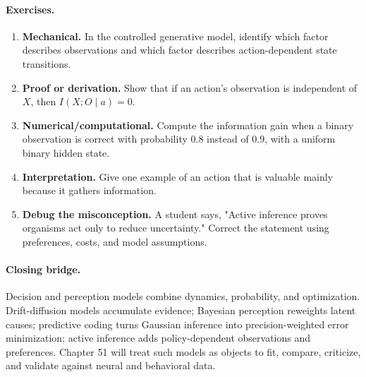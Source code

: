 \paragraph{Exercises.}
\begin{enumerate}[label=\textbf{50.4.\arabic*.}, leftmargin=*]
\item \textbf{Mechanical.} In the controlled generative model, identify which factor describes observations and which factor describes action-dependent state transitions.
\item \textbf{Proof or derivation.} Show that if an action's observation is independent of \(X\), then \(I(X;O\mid a)=0\).
\item \textbf{Numerical/computational.} Compute the information gain when a binary observation is correct with probability \(0.8\) instead of \(0.9\), with a uniform binary hidden state.
\item \textbf{Interpretation.} Give one example of an action that is valuable mainly because it gathers information.
\item \textbf{Debug the misconception.} A student says, "Active inference proves organisms act only to reduce uncertainty." Correct the statement using preferences, costs, and model assumptions.
\end{enumerate}

\paragraph{Closing bridge.}
Decision and perception models combine dynamics, probability, and optimization. Drift-diffusion models accumulate evidence; Bayesian perception reweights latent causes; predictive coding turns Gaussian inference into precision-weighted error minimization; active inference adds policy-dependent observations and preferences. Chapter 51 will treat such models as objects to fit, compare, criticize, and validate against neural and behavioral data.

\clearpage
